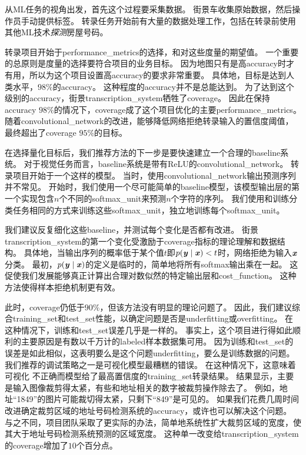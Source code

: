 
从\gls{ML}任务的视角出发，首先这个过程要采集数据。
街景车收集原始数据，然后操作员手动提供标签。
转录任务开始前有大量的数据处理工作，包括在转录前使用其他\gls{ML}技术\emph{探测}房屋号码。


转录项目开始于\gls{performance_metrics}的选择，和对这些度量的期望值。
一个重要的总原则是度量的选择要符合项目的业务目标。
因为地图只有是高\gls{accuracy}时才有用，所以为这个项目设置高\gls{accuracy}的要求非常重要。
具体地，目标是达到人类水平，$98\%$的\gls{accuracy}。
这种程度的\gls{accuracy}并不是总能达到。
为了达到这个级别的\gls{accuracy}，街景\gls{transcription_system}牺牲了\gls{coverage}。
因此在保持\gls{accuracy} $98\%$的情况下，\gls{coverage}成了这个项目优化的主要\gls{performance_metrics}。
随着\gls{convolutional_network}的改进，能够降低网络拒绝转录输入的置信度阈值，最终超出了\gls{coverage} $95\%$的目标。


在选择量化目标后，我们推荐方法的下一步是要快速建立一个合理的\gls{baseline}系统。
对于视觉任务而言，\gls{baseline}系统是带有\gls{ReLU}的\gls{convolutional_network}。
转录项目开始于一个这样的模型。
当时，使用\gls{convolutional_network}输出预测序列并不常见。
开始时，我们使用一个尽可能简单的\gls{baseline}模型，该模型输出层的第一个实现包含$n$个不同的\gls{softmax_unit}来预测$n$个字符的序列。
我们使用和训练分类任务相同的方式来训练这些\gls{softmax_unit}，独立地训练每个\gls{softmax_unit}。


我们建议反复细化这些\gls{baseline}，并测试每个变化是否都有改进。
街景\gls{transcription_system}的第一个变化受激励于\gls{coverage}指标的理论理解和数据结构。
具体地，当输出序列的概率低于某个值$t$即$p(\boldsymbol{\mathit{y}}\mid\boldsymbol{\mathit{x}}) < t$时，网络拒绝为输入$\boldsymbol{\mathit{x}}$分类。
最初，$p(\boldsymbol{\mathit{y}}\mid\boldsymbol{\mathit{x}})$的定义是临时的，简单地将所有\gls{softmax}输出乘在一起。
这促使我们发展能够真正计算出合理对数似然的特定输出层和\gls{cost_function}。%
这种方法使得样本拒绝机制更有效。


此时，\gls{coverage}仍低于$90\%$，但该方法没有明显的理论问题了。
因此，我们建议综合\gls{training_set}和\gls{test_set}性能，以确定问题是否是\gls{underfitting}或\gls{overfitting}。
在这种情况下，训练和\gls{test_set}误差几乎是一样的。
事实上，这个项目进行得如此顺利的主要原因是有数以千万计的\gls{labeled}样本数据集可用。
因为训练和\gls{test_set}的误差是如此相似，这表明要么是这个问题\gls{underfitting}，要么是训练数据的问题。
我们推荐的调试策略之一是可视化模型最糟糕的错误。
在这种情况下，这意味着可视化 不正确而模型给了最高置信度的\gls{training_set}转录结果。
结果显示，主要是输入图像裁剪得太紧，有些和地址相关的数字被裁剪操作除去了。
例如，地址``1849''的图片可能裁切得太紧，只剩下``849''是可见的。
如果我们花费几周时间改进确定裁剪区域的地址号码检测系统的\gls{accuracy}，或许也可以解决这个问题。%
与之不同，项目团队采取了更实际的办法，简单地系统性扩大裁剪区域的宽度，使其大于地址号码检测系统预测的区域宽度。%
这种单一改变给\gls{transcription_system}的\gls{coverage}增加了$10$个百分点。

